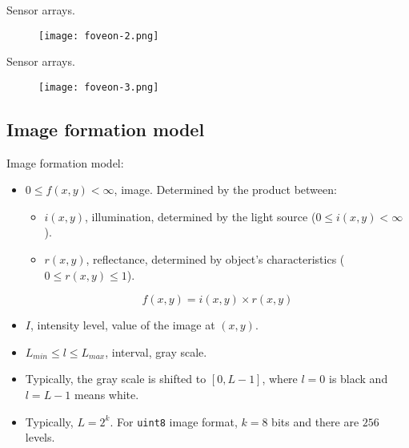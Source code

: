 
\begin{frame}
Sensor arrays.
\begin{figure}
\texttt{[image: foveon-2.png]}
\end{figure}
\end{frame}


\begin{frame}
Sensor arrays.
\begin{figure}
\texttt{[image: foveon-3.png]}
\end{figure}
\end{frame}


\subsection{Image formation model}


\begin{frame}
Image formation model:
\begin{itemize}
\item $0\leq f(x,y)<\infty$, image. Determined by the product between:
\begin{itemize}
\item $i(x,y)$, illumination, determined by the light source ($0\leq i(x,y)<\infty$).
\item $r(x,y)$, reflectance, determined by object's characteristics ($0\leq r(x,y)\leq 1$).
\end{itemize}
\begin{equation}
f(x,y) = i(x,y) \times r(x,y)
\end{equation}
\end{itemize}
\end{frame}


\begin{frame}
\begin{itemize}
\item $I$, intensity level, value of the image at $(x,y)$.
\item $L_{min} \leq l \leq L_{max}$, interval, gray scale.
\item Typically, the gray scale is shifted to $[0,L-1]$, where $l=0$ is black and $l=L-1$ means white.
\item Typically, $L=2^{k}$. For \texttt{uint8} image format, $k=8$ bits and there are $256$ levels.
\end{itemize}
\end{frame}

